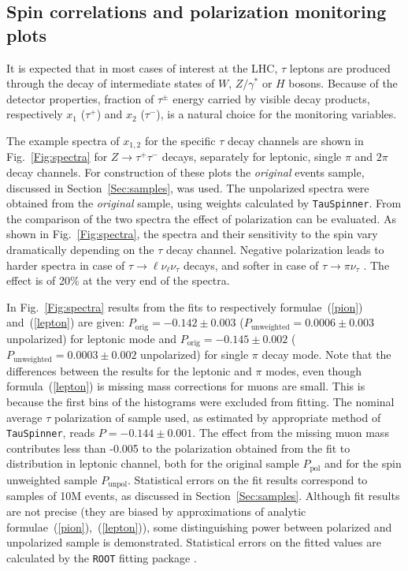 \documentclass{article}
\begin{document}
\subsection{Spin correlations and  polarization monitoring plots} \label{Sec:PlotCategories}


It is expected that in most cases of interest at the LHC,  $\tau$ leptons are produced through the decay of intermediate states
of $W$, $Z/\gamma^*$ or $H$ bosons. Because of the detector properties,  fraction
of $\tau^\pm$ energy carried by visible decay products, respectively $x_1$ ($\tau^{+}$) and $x_2$ ($\tau^{-}$), is 
a natural choice for the 
monitoring variables. 

The example spectra of $x_{1,2}$ for the specific
$\tau$ decay channels are shown in Fig.~\ref{Fig:spectra} for $Z \to \tau^+ \tau^-$ decays, separately 
for leptonic, single $\pi$ and $2 \pi$ decay channels. 
For construction
of these plots the {\it original } events sample, discussed in Section~\ref{Sec:samples}, was used.
The unpolarized spectra were obtained from the  {\it original } sample, using
weights calculated by {\tt TauSpinner}.  From the comparison of the two spectra the 
effect of polarization can be evaluated. As shown in Fig.~\ref{Fig:spectra}, the spectra and their sensitivity 
to the spin vary dramatically depending on the $\tau$  decay channel. 
Negative polarization leads to harder spectra in case of $\tau \to \ell \nu_\ell\nu_\tau$ decays,
and softer in case of $\tau \to  \pi \nu_\tau $ .  The effect is of 20\%  at the very end of the spectra. 

In Fig.~\ref{Fig:spectra} results from the fits to respectively
formulae~(\ref{pion}) and~(\ref{lepton}) are given:
$P_{\mathrm{orig}}=-0.142 \pm 0.003$ ($P_{\mathrm{unweighted}}= 0.0006 \pm 0.003$ unpolarized) for leptonic mode and 
$P_{\mathrm{orig}}=-0.145 \pm 0.002$ ($P_{\mathrm{unweighted}}= 0.0003 \pm 0.002$ unpolarized) for single $\pi$ decay mode.
Note that the differences between the results for the leptonic and $\pi$ modes, 
even though formula~(\ref{lepton}) is missing mass corrections for muons are small. This is because the first bins of the histograms were excluded from fitting.
The nominal average $\tau$ polarization of sample used, as
estimated by appropriate method of {\tt TauSpinner}, reads  $P=-0.144 \pm 0.001$.
The effect from the missing muon mass contributes less than -0.005 to the polarization
obtained from the fit to distribution in leptonic channel,
both for the original sample $P_{\mathrm{pol}}$ and for the spin unweighted sample
$P_{\mathrm{unpol}}$. 
Statistical errors on the fit results correspond to samples of 10M events, as discussed in Section~\ref{Sec:samples}.
Although fit results are not precise (they are biased by approximations
of analytic formulae~(\ref{pion}),~(\ref{lepton})), some distinguishing power between polarized 
and unpolarized
sample is demonstrated. Statistical errors on the fitted values are calculated by the {\tt ROOT} fitting 
package \cite{root-install-www}.
\end{document}

